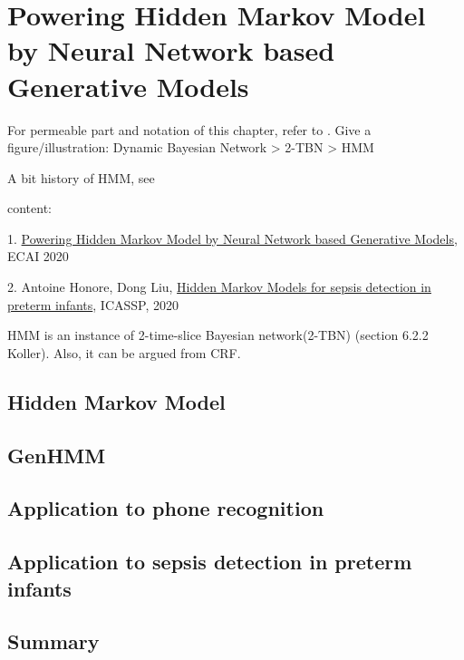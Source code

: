 \chapter{Powering Hidden Markov Model by Neural Network based Generative Models}

For permeable part and notation of this chapter, refer to \cite[Chapter~6.2]{koller2009pgm}.
Give a figure/illustration: Dynamic Bayesian Network > 2-TBN > HMM

A bit history of HMM, see \cite[Chapter~6.8]{koller2009pgm}

content:

1. \href{https://arxiv.org/abs/1910.05744}{Powering Hidden Markov Model by Neural Network based Generative Models}, ECAI 2020

2. Antoine Honore, Dong Liu, \href{https://arxiv.org/pdf/1910.13904.pdf}{Hidden Markov Models for sepsis detection in preterm infants}, ICASSP, 2020

HMM is an instance of 2-time-slice Bayesian network(2-TBN) (section 6.2.2 Koller). Also, it can be argued from CRF.
\section{Hidden Markov Model}

\section{GenHMM}

\section{Application to phone recognition}

\section{Application to sepsis detection in preterm infants}

\section{Summary}

